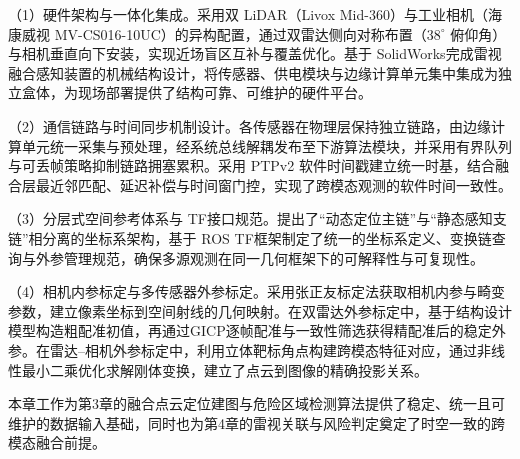 （1）硬件架构与一体化集成。采用双 LiDAR（Livox Mid-360）与工业相机（海康威视 MV-CS016-10UC）的异构配置，通过双雷达侧向对称布置（$38^\circ$ 俯仰角）与相机垂直向下安装，实现近场盲区互补与覆盖优化。基于 SolidWorks完成雷视融合感知装置的机械结构设计，将传感器、供电模块与边缘计算单元集中集成为独立盒体，为现场部署提供了结构可靠、可维护的硬件平台。

（2）通信链路与时间同步机制设计。各传感器在物理层保持独立链路，由边缘计算单元统一采集与预处理，经系统总线解耦发布至下游算法模块，并采用有界队列与可丢帧策略抑制链路拥塞累积。采用 PTPv2 软件时间戳建立统一时基，结合融合层最近邻匹配、延迟补偿与时间窗门控，实现了跨模态观测的软件时间一致性。

（3）分层式空间参考体系与 TF接口规范。提出了“动态定位主链”与“静态感知支链”相分离的坐标系架构，基于 ROS TF框架制定了统一的坐标系定义、变换链查询与外参管理规范，确保多源观测在同一几何框架下的可解释性与可复现性。

（4）相机内参标定与多传感器外参标定。采用张正友标定法获取相机内参与畸变参数，建立像素坐标到空间射线的几何映射。在双雷达外参标定中，基于结构设计模型构造粗配准初值，再通过GICP逐帧配准与一致性筛选获得精配准后的稳定外参。在雷达--相机外参标定中，利用立体靶标角点构建跨模态特征对应，通过非线性最小二乘优化求解刚体变换，建立了点云到图像的精确投影关系。

本章工作为第3章的融合点云定位建图与危险区域检测算法提供了稳定、统一且可维护的数据输入基础，同时也为第4章的雷视关联与风险判定奠定了时空一致的跨模态融合前提。

